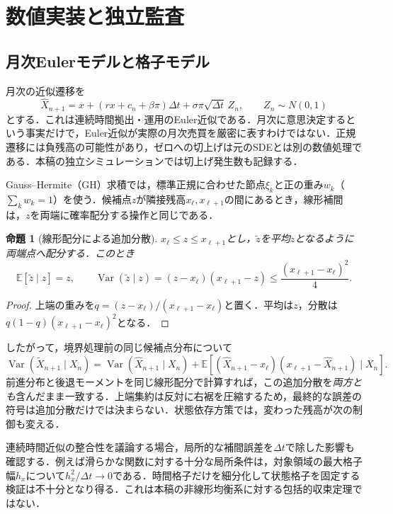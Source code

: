\documentclass[11pt,a4paper]{article}
\numberwithin{equation}{section}
\numberwithin{table}{section}
\numberwithin{figure}{section}
\theoremstyle{plain}
\newtheorem{proposition}{命題}
\theoremstyle{definition}
\newcommand{\E}{\mathbb{E}}
\DeclareMathOperator{\Var}{Var}
\begin{document}
\FloatBarrier
\section{数値実装と独立監査}
\label{sec:interpolation}
\subsection{月次Eulerモデルと格子モデル}
月次の近似遷移を
\begin{equation}
\widehat X_{n+1}=x+(rx+c_n+\beta\pi)\Delta t+
\sigma\pi\sqrt{\Delta t}\,Z_n,\qquad Z_n\sim N(0,1)
\label{eq:euler}
\end{equation}
とする．これは連続時間拠出・運用のEuler近似である．月次に意思決定するという事実だけで，Euler近似が実際の月次売買を厳密に表すわけではない．正規遷移には負残高の可能性があり，ゼロへの切上げは元のSDEとは別の数値処理である．本稿の独立シミュレーションでは切上げ発生数も記録する．

Gauss--Hermite（GH）求積では，標準正規に合わせた節点$\xi_k$と正の重み$w_k$（$\sum_kw_k=1$）を使う．候補点$z$が隣接残高$x_\ell,x_{\ell+1}$の間にあるとき，線形補間は，$z$を両端に確率配分する操作と同じである．
\begin{proposition}[線形配分による追加分散]
\label{prop:interpolation}
$x_\ell\leq z\leq x_{\ell+1}$とし，$\widetilde z$を平均$z$となるように両端点へ配分する．このとき
\begin{equation}
\E[\widetilde z\mid z]=z,\qquad
\Var(\widetilde z\mid z)=(z-x_\ell)(x_{\ell+1}-z)
\leq\frac{(x_{\ell+1}-x_\ell)^2}{4}.
\label{eq:interpvar}
\end{equation}
\end{proposition}
\begin{proof}
上端の重みを$q=(z-x_\ell)/(x_{\ell+1}-x_\ell)$と置く．平均は$z$，分散は$q(1-q)(x_{\ell+1}-x_\ell)^2$となる．
\end{proof}
したがって，境界処理前の同じ候補点分布について
\begin{equation}
\Var(\widetilde X_{n+1}\mid X_n)
=\Var(\widehat X_{n+1}\mid X_n)+
\E[(\widehat X_{n+1}-x_\ell)(x_{\ell+1}-\widehat X_{n+1})\mid X_n].
\label{eq:artificial}
\end{equation}
前進分布と後退モーメントを同じ線形配分で計算すれば，この追加分散を\emph{両方とも}含んだまま一致する．上端集約は反対に右裾を圧縮するため，最終的な誤差の符号は追加分散だけでは決まらない．状態依存方策では，変わった残高が次の制御も変える．

連続時間近似の整合性を議論する場合，局所的な補間誤差を$\Delta t$で除した影響も確認する．例えば滑らかな関数に対する十分な局所条件は，対象領域の最大格子幅$h_x$について$h_x^2/\Delta t\to0$である．時間格子だけを細分化して状態格子を固定する検証は不十分となり得る．これは本稿の非線形均衡系に対する包括的収束定理ではない．
\end{document}
